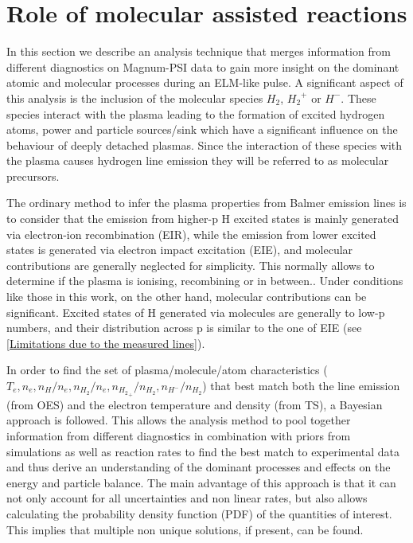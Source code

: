 \section{Role of molecular assisted reactions}\label{Role of molecular assisted reactions}
In this section we describe an analysis technique that merges information from different diagnostics on Magnum-PSI data to gain more insight on the dominant atomic and molecular processes during an ELM-like pulse. A significant aspect of this analysis is the inclusion of the molecular species $H_2$, ${H_2}^+$ or $H^-$. These species interact with the plasma leading to the formation of excited hydrogen atoms, power and particle sources/sink which have a significant influence on the behaviour of deeply detached plasmas. Since the interaction of these species with the plasma causes hydrogen line emission they will be referred to as molecular precursors.

The ordinary method to infer the plasma properties from Balmer emission lines is to consider that the emission from higher-p H excited states is mainly generated via electron-ion recombination (EIR), while the emission from lower excited states is generated via electron impact excitation (EIE), and molecular contributions are generally neglected for simplicity. This normally allows to determine if the plasma is ionising, recombining or in between.\cite{Potzel2012,Verhaegh2019}. Under conditions like those in this work, on the other hand, molecular contributions can be significant.\cite{Akkermans2020} Excited states of H generated via molecules are generally to low-p numbers, and their distribution across p is similar to the one of EIE (see \autoref{Limitations due to the measured lines}). 

In order to find the set of plasma/molecule/atom characteristics ($T_e, n_e, n_{H}/n_e, n_{H_2}/n_e, n_{{H_2}_+}/n_{H_2}, n_{{H}^-}/n_{H_2}$) that best match both the line emission (from OES) and the electron temperature and density (from TS), a Bayesian approach is followed. This allows the analysis method to pool together information from different diagnostics in combination with priors from simulations as well as reaction rates to find the best match to experimental data and thus derive an understanding of the dominant processes and effects on the energy and particle balance. The main advantage of this approach is that it can not only account for all uncertainties and non linear rates, but also allows calculating the probability density function (PDF) of the quantities of interest. This implies that multiple non unique solutions, if present, can be found.

